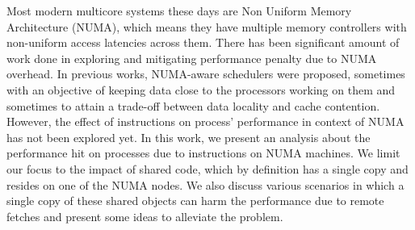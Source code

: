 
Most modern multicore systems these days are Non Uniform Memory Architecture (NUMA), which means they have multiple memory controllers
with non-uniform access latencies across them. There has been significant amount of work done in exploring and 
mitigating performance penalty due to NUMA overhead. In previous works, NUMA-aware schedulers were proposed,
sometimes with an objective of keeping data close to the processors working on them and sometimes to attain a 
trade-off between data locality and cache contention. \\
However, the effect of instructions on process' performance in context of NUMA has not been explored yet.
In this work, we present an analysis about the performance hit on processes due to instructions on NUMA machines.
We limit our focus to the impact of shared code, which by definition has a single copy and resides on one of the NUMA nodes.
We also discuss various scenarios in which a single copy of these shared objects can harm the performance due to remote
fetches and present some ideas to alleviate the problem.

